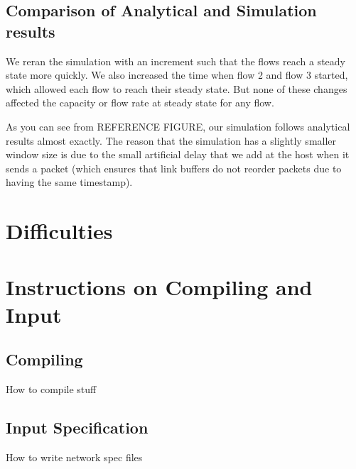 \documentclass[12pt]{article}
\begin{document}
\subsection{Comparison of Analytical and Simulation results}
We reran the simulation with an increment such that the flows reach a steady state more quickly. We also increased the time when flow 2 and flow 3 started, which allowed each flow to reach their steady state. But none of these changes affected the capacity or flow rate at steady state for any flow.

As you can see from REFERENCE FIGURE, our simulation follows analytical results almost exactly. The reason that the simulation has a slightly smaller window size is due to the small artificial delay that we add at the host when it sends a packet (which ensures that link buffers do not reorder packets due to having the same timestamp).

\section{Difficulties}



\appendix
\section{Instructions on Compiling and Input}

\subsection{Compiling}
How to compile stuff


\subsection{Input Specification}
How to write network spec files
\end{document}
